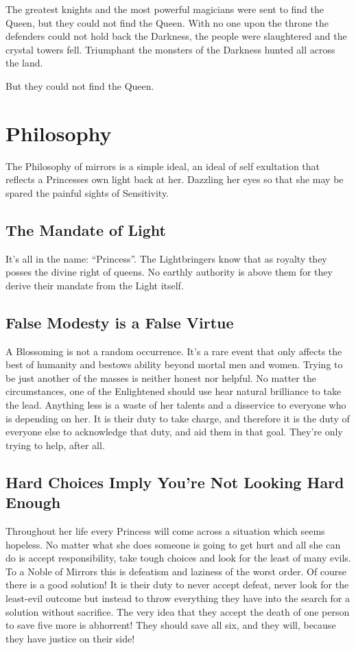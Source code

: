 The greatest knights and the most powerful magicians were sent to find the Queen, but they could not find the Queen. With no one upon the throne the defenders could not hold back the Darkness, the people were slaughtered and the crystal towers fell. Triumphant the monsters of the Darkness hunted all across the land. 

But they could not find the Queen. 

\section*{Philosophy}

The Philosophy of mirrors is a simple ideal, an ideal of self exultation that reflects a Princesses own light back at her. Dazzling her eyes so that she may be spared the painful sights of Sensitivity.

\subsection*{The Mandate of Light}

It's all in the name: \textquotedblleft Princess\textquotedblright. The Lightbringers know that as royalty they posses the divine right of queens. No earthly authority is above them for they derive their mandate from the Light itself. 

\subsection*{False Modesty is a False Virtue}

A Blossoming is not a random occurrence. It's a rare event that only affects the best of humanity and bestows ability beyond mortal men and women. Trying to be just another of the masses is neither honest nor helpful. No matter the circumstances, one of the Enlightened should use hear natural brilliance to take the lead. Anything less is a waste of her talents and a disservice to everyone who is depending on her. It is their duty to take charge, and therefore it is the duty of everyone else to acknowledge that duty, and aid them in that goal. They're only trying to help, after all. 

\subsection*{Hard Choices Imply You're Not Looking Hard Enough}

Throughout her life every Princess will come across a situation which seems hopeless. No matter what she does someone is going to get hurt and all she can do is accept responsibility, take tough choices and look for the least of many evils. To a Noble of Mirrors this is defeatism and laziness of the worst order. Of course there is a good solution! It is their duty to never accept defeat, never look for the least-evil outcome but instead to throw everything they have into the search for a solution without sacrifice. The very idea that they accept the death of one person to save five more is abhorrent! They should save all six, and they will, because they have justice on their side! 

